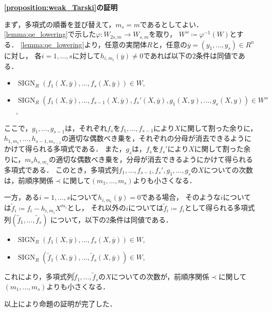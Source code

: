 \documentclass[uplatex, dvipdfmx]{jsarticle}
\makeatletter
\numberwithin{equation}{section}
\renewenvironment{proof}[1][\proofname]{\par
  \pushQED{\qed}%
  \normalfont \topsep6\p@\@plus6\p@\relax
  \trivlist
  \item\relax
  {\bfseries
  #1\@addpunct{.}}\hspace\labelsep\ignorespaces
}{
  \popQED\endtrivlist\@endpefalse
}
\newcommand{\map}[3]{{#1}\colon{#2}\rightarrow{#3}}
\DeclareMathOperator{\SIGN}{SIGN}
\theoremstyle{definition}
\renewcommand{\proofname}{\textbf{証明}}
\makeatother
\begin{document}
\begin{proof}[\cref{proposition:weak_Tarski}の証明]
     まず，多項式の順番を並び替えて，$m_s=m$であるとしてよい．
     \cref{lemma:qe_lowering}で示した$\map{\varphi}{W_{2s,m}}{W_{s,m}}$を取り，
     $W''\coloneqq \varphi^{-1}(W)$とする．
     \cref{lemma:qe_lowering}より，任意の実閉体$R$と，任意の$\overline{y} = (y_1, \dots, y_s) \in R^n$に対し，
     各$i=1, \dots, s$に対して$h_{i, m_i}(\overline{y}) \neq 0$であれば以下の2条件は同値である．
     \begin{itemize}
          \item $\SIGN_R(f_1(X,\overline{y}), \dots, f_s(X, \overline{y})) \in W$,
          \item $\SIGN_R(f_1(X,\overline{y}), \dots, f_{s-1}(X, \overline{y}), f_s'(X, \overline{y}), g_1(X,y), \dots, g_s(X,y)) \in W''$,
     \end{itemize}
     ここで，$g_1, \dots, g_{s-1}$は，それぞれ$f_s$を$f_1, \dots, f_{s-1}$により$X$に関して割った余りに，
     $h_{1, m_1}, \dots, h_{s-1, m_{s-1}}$の適切な偶数べき乗を，それぞれの分母が消去できるようにかけて得られる多項式である．
     また，$g_s$は，$f_s$を$f_s'$により$X$に関して割った余りに，$m_s h_{s,m_s}$の適切な偶数べき乗を，分母が消去できるようにかけて得られる多項式である．
     このとき，多項式列$f_1, \dots, f_{s-1}, f_s', g_1, \dots, g_s$の$X$についての次数は，前順序関係$\prec$に関して$(m_1, \dots, m_s)$よりも小さくなる．
 
     一方，ある$i=1, \dots, s$について$h_{i, m_i}(\overline{y}) = 0$である場合，
     そのような$i$については$\widetilde{f}_i \coloneqq f_i - h_{i, m_i}X^{m_i}$とし，
     それ以外の$i$については$\widetilde{f}_i \coloneqq f_i$として得られる多項式列$(\widetilde{f}_1, \dots, \widetilde{f}_s)$
     について，以下の2条件は同値である．
     \begin{itemize}
          \item $\SIGN_R(f_1(X,\overline{y}), \dots, f_s(X, \overline{y})) \in W$,
          \item $\SIGN_R(\widetilde{f}_1(X,\overline{y}), \dots, \widetilde{f}_s(X, \overline{y})) \in W$,
     \end{itemize}
     これにより，多項式列$\widetilde{f}_1, \dots, \widetilde{f}_s$の$X$についての次数が，前順序関係$\prec$に関して$(m_1, \dots, m_s)$よりも小さくなる．

     以上により命題の証明が完了した．
\end{proof}
\end{document}
